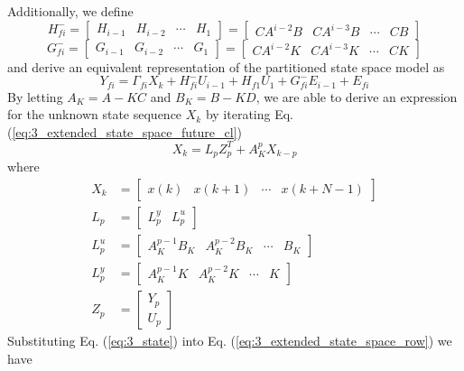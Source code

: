 Additionally, we define 
\begin{equation*}
H_{fi}^{-} = \begin{bmatrix} H_{i-1} & H_{i-2} & \cdots & H_1\end{bmatrix} = \begin{bmatrix} CA^{i-2}B & CA^{i-3}B & \cdots & CB\end{bmatrix}
\end{equation*}
\begin{equation*}
G_{fi}^{-} = \begin{bmatrix} G_{i-1} & G_{i-2} & \cdots & G_1\end{bmatrix} = \begin{bmatrix} CA^{i-2}K & CA^{i-3}K & \cdots & CK\end{bmatrix}
\end{equation*}
and derive an equivalent representation of the partitioned state space model as
\begin{equation}\label{eq:3_extended_state_space_row}
Y_{fi} = \Gamma_{fi}X_k + H_{fi}^- U_{i-1} + H_{f1}U_1 + G_{fi}^- E_{i-1} + E_{fi}
\end{equation}
By letting $A_K = A - KC$ and $B_K = B-KD$, we are able to derive an expression for the unknown state sequence $X_k$ by iterating Eq. (\ref{eq:3_extended_state_space_future_cl})
\begin{equation}\label{eq:3_state}
X_k = L_p Z_p^T + A_K^p X_{k-p}
\end{equation}
where
\begin{align*}
X_k &= \begin{bmatrix} x(k) & x(k+1) & \cdots & x(k+N-1)\end{bmatrix}\\
L_p &= \begin{bmatrix}L_p^y & L_p^u\end{bmatrix}\\
L_p^u &= \begin{bmatrix}A_K^{p-1}B_K & A_K^{p-2}B_K & \cdots & B_K\end{bmatrix}\\
L_p^y &= \begin{bmatrix}A_K^{p-1}K & A_K^{p-2}K & \cdots & K\end{bmatrix}\\
Z_p &= \begin{bmatrix} Y_p \\ U_p\end{bmatrix}
\end{align*}
Substituting Eq. (\ref{eq:3_state}) into Eq. (\ref{eq:3_extended_state_space_row}) we have
